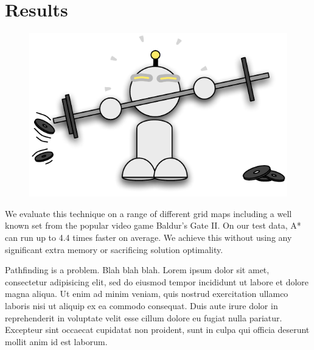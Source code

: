 \section{Results}
 \begin{figure}
\vspace{-4em}
		\includegraphics[width=0.45\columnwidth]{diagrams/robot_weights.pdf}
 \end{figure}

We evaluate this technique on a range of different grid maps 
including a well known set from the popular video game Baldur's Gate II.
On our test data, A* can run up to 4.4 times faster on average.
We achieve this without using any significant extra memory or sacrificing solution optimality.


Pathfinding is a problem. Blah blah blah.
Lorem ipsum dolor sit amet, consectetur adipisicing elit, sed do eiusmod
tempor incididunt ut labore et dolore magna aliqua. Ut enim ad minim
veniam, quis nostrud exercitation ullamco laboris nisi ut aliquip ex ea
commodo consequat. Duis aute irure dolor in reprehenderit in voluptate
velit esse cillum dolore eu fugiat nulla pariatur. Excepteur sint occaecat
cupidatat non proident, sunt in culpa qui officia deserunt mollit anim
id est laborum.

